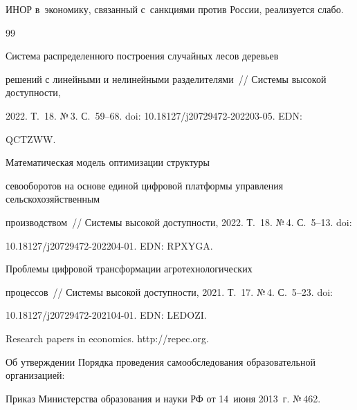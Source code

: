 ИНОР в~экономику, связанный с~санкциями против России, реализуется слабо.


  


{\small\frenchspacing


{%




\begin{thebibliography}{99}




   Система распределенного построения случайных лесов деревьев 


решений с линейными и нелинейными разделителями~/\!\!/ Системы высокой доступности, 


2022. Т.~18. №\,3. С.~59--68. doi: 10.18127\!/\!j20729472-202203-05. EDN: 


QCTZWW.


  




   Математическая модель оптимизации структуры 


севооборотов на основе единой цифровой платформы управления сельскохозяйственным 


производством~/\!\!/  Системы высокой доступности, 2022. Т.~18. №\,4. С.~5--13. doi:  


10.18127\!/\!j20729472-202204-01. EDN: RPXYGA.


  




   Проблемы цифровой трансформации агротехнологических 


процессов~/\!\!/  Системы высокой доступности, 2021. Т.~17. №\,4. С.~5--23. doi: 


10.18127\!/\!j20729472-202104-01. EDN: LEDOZI.


  




  Research papers in economics. {\sf http://repec.org}.




  Об утверждении Порядка проведения самообследования образовательной организацией: 


Приказ Министерства образования и науки РФ от 14~июня 2013~г. №\,462. {\sf 


}
\end{thebibliography}}}
